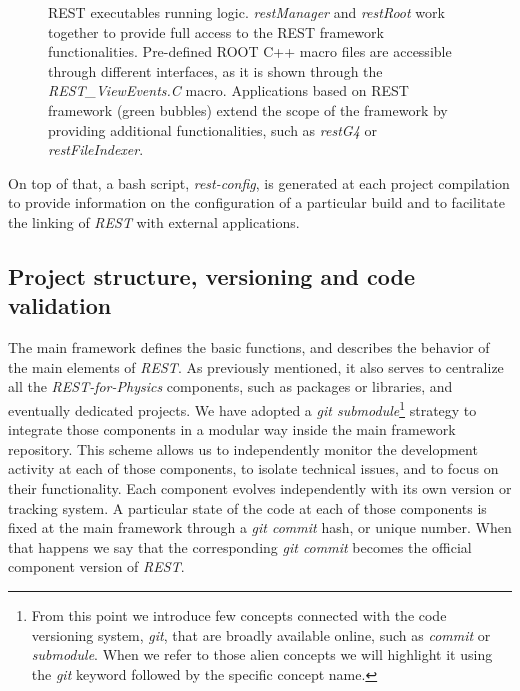 \begin{figure}[htb!]
  \centering
	\caption{REST executables running logic. \emph{restManager} and \emph{restRoot} work together to provide full access to the REST framework functionalities. Pre-defined ROOT C++ macro files are accessible through different interfaces, as it is shown through the \emph{REST\_ViewEvents.C} macro. Applications based on REST framework (green bubbles) extend the scope of the framework by providing additional functionalities, such as \emph{restG4} or \emph{restFileIndexer}.}
	\label{fig:executables}
\end{figure}

On top of that, a bash script, \emph{rest-config}, is generated at each project compilation to provide information on the configuration of a particular build and to facilitate the linking of \emph{REST} with external applications. 

\subsection{Project structure, versioning and code validation}

The main framework defines the basic functions, and describes the behavior of the main elements of \emph{REST}. As previously mentioned, it also serves to centralize all the \emph{REST-for-Physics} components, such as packages or libraries, and eventually dedicated projects. We have adopted a \emph{git submodule}\footnote{From this point we introduce few concepts connected with the code versioning system, \emph{git}, that are broadly available online, such as \emph{commit} or \emph{submodule}. When we refer to those alien concepts we will highlight it using the \emph{git} keyword followed by the specific concept name.} strategy to integrate those components in a modular way inside the main framework repository. This scheme allows us to independently monitor the development activity at each of those components, to isolate technical issues, and to focus on their functionality. Each component evolves independently with its own version or tracking system. A particular state of the code at each of those components is fixed at the main framework through a \emph{git commit} hash, or unique number. When that happens we say that the corresponding \emph{git commit} becomes the official component version of \emph{REST}.

